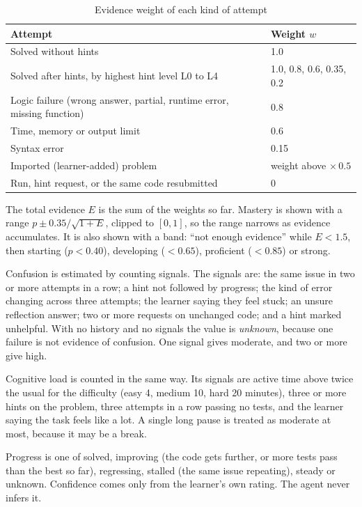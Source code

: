 \begin{table}[htbp]\centering\small
\caption{Evidence weight of each kind of attempt}\label{tab:weights}
\begin{tabular}{|R{7.2cm}|R{4.5cm}|}\hline
\textbf{Attempt} & \textbf{Weight $w$}\\\hline
Solved without hints & 1.0\\\hline
Solved after hints, by highest hint level L0 to L4 & 1.0, 0.8, 0.6, 0.35, 0.2\\\hline
Logic failure (wrong answer, partial, runtime error, missing function) & 0.8\\\hline
Time, memory or output limit & 0.6\\\hline
Syntax error & 0.15\\\hline
Imported (learner-added) problem & weight above $\times\,0.5$\\\hline
Run, hint request, or the same code resubmitted & 0\\\hline
\end{tabular}
\end{table}

The total evidence $E$ is the sum of the weights so far. Mastery is shown with a range $p \pm 0.35/\sqrt{1+E}$, clipped to $[0,1]$, so the range narrows as evidence accumulates. It is also shown with a band: ``not enough evidence'' while $E<1.5$, then starting ($p<0.40$), developing ($<0.65$), proficient ($<0.85$) or strong.

Confusion is estimated by counting signals. The signals are: the same issue in two or more attempts in a row; a hint not followed by progress; the kind of error changing across three attempts; the learner saying they feel stuck; an unsure reflection answer; two or more requests on unchanged code; and a hint marked unhelpful. With no history and no signals the value is \emph{unknown}, because one failure is not evidence of confusion. One signal gives moderate, and two or more give high.

Cognitive load is counted in the same way. Its signals are active time above twice the usual for the difficulty (easy 4, medium 10, hard 20 minutes), three or more hints on the problem, three attempts in a row passing no tests, and the learner saying the task feels like a lot. A single long pause is treated as moderate at most, because it may be a break.

Progress is one of solved, improving (the code gets further, or more tests pass than the best so far), regressing, stalled (the same issue repeating), steady or unknown. Confidence comes only from the learner's own rating. The agent never infers it.

